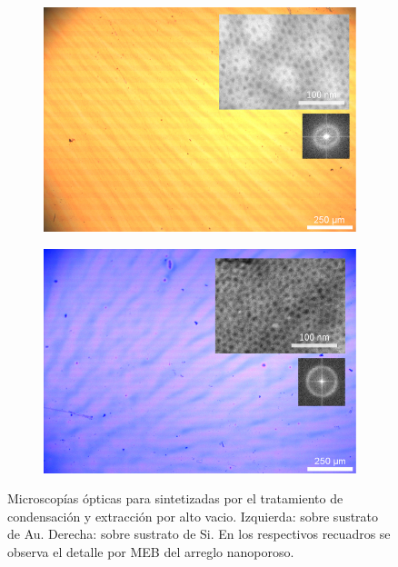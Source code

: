 {		\begin{figure}[!th]
	 	   	    \begin{subfigure}[t]{0.49\textwidth}
		       	\includegraphics[width=\textwidth]{Imagenes/Au_130VF127-Combinada.jpg}
		   		\end{subfigure}
		   		\begin{subfigure}[t]{0.49\textwidth}
		   	    \includegraphics[width=\textwidth]{Imagenes/Si_130VF127-Combinada.jpg}
		   		\end{subfigure}
				 \caption[Microscopía óptica \pdmF\space tratamiento vacío.]{Microscopías ópticas para \pdmF\space sintetizadas por el tratamiento de condensación y extracción por alto vacio. Izquierda: sobre sustrato de Au. Derecha: sobre sustrato de Si. En los respectivos recuadros se observa el detalle por MEB del arreglo nanoporoso.}
				 \label{fig:Microscopia_F127_vacio}	
			     \end{figure}	

}
